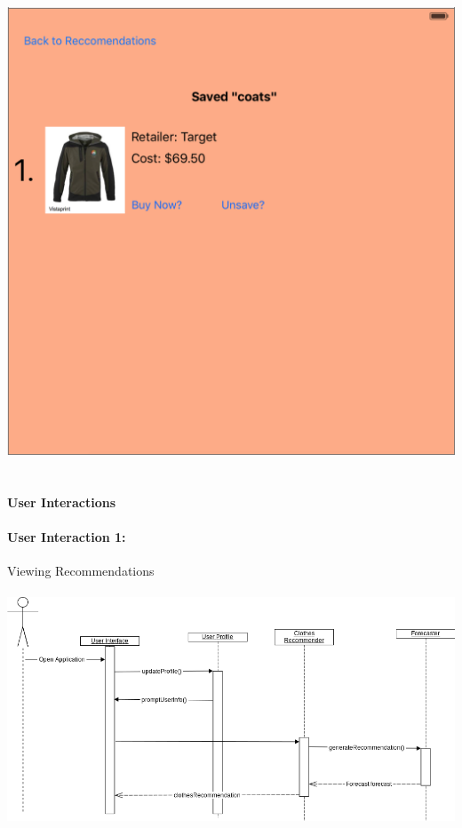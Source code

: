 \documentclass[12pt,a4paper]{article}
\begin{document}
\includegraphics[scale=0.5]{Savedlists.png}\\\\

\paragraph{User Interactions}
\paragraph{User Interaction 1:} Viewing Recommendations\\\\
\includegraphics[scale=0.5]{us_01_veiwrecs.png}
\end{document}
